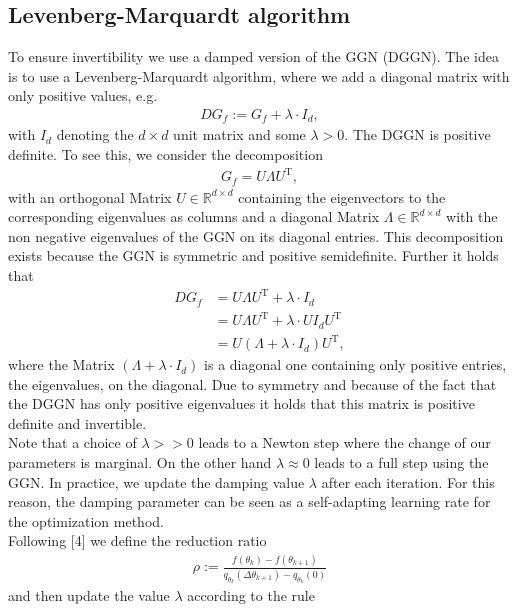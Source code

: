 \documentclass[conference]{IEEEtran}
\begin{document}
	\subsection{Levenberg-Marquardt algorithm }
	\noindent
	To ensure invertibility we use a damped version of the GGN (DGGN). The idea is to use a Levenberg-Marquardt algorithm, where we add a diagonal matrix with only positive values, e.g.
	\begin{align}
	DG_{f} := G_{f} + \lambda\cdot I_{d},
	\end{align}
	with $I_{d}$ denoting the $d\times d$ unit matrix and some $\lambda>0$.
	The DGGN is positive definite.
	To see this, we consider the decomposition
	\begin{align}
	G_{f} = U\Lambda U^{\mathrm{T}},
	\end{align}
	with an orthogonal Matrix $U\in\mathbb{R}^{d\times d}$ containing the eigenvectors to the corresponding eigenvalues as columns and a diagonal Matrix $\Lambda\in\mathbb{R}^{d\times d}$ with the non negative eigenvalues of the GGN on its diagonal entries. This decomposition exists because the GGN is symmetric and positive semidefinite. Further it holds that
	\begin{align}
	DG_{f} &= U\Lambda U^{\mathrm{T}} + \lambda\cdot I_{d}\\
	&= U\Lambda U^{\mathrm{T}} + \lambda\cdot U I_{d}U^{\mathrm{T}}\\
	&= U\left(\Lambda + \lambda\cdot I_{d}\right)U^{\mathrm{T}},
	\end{align}
	where the Matrix $\left(\Lambda + \lambda\cdot I_{d}\right)$ is a diagonal one containing only positive entries, the eigenvalues, on the diagonal. Due to symmetry and because of the fact that the DGGN has only positive eigenvalues it holds that this matrix is positive definite and invertible.\\
	Note that a choice of $\lambda>>0$ leads to a Newton step where the change of our parameters is marginal. On the other hand $\lambda\approx 0$ leads to a full step using the GGN. In practice, we update the damping value $\lambda$ after each iteration. For this reason, the damping parameter can be seen as a self-adapting learning rate for the optimization method.\\
	Following [4] we define the reduction ratio
	\begin{align}
	\rho := \frac{f(\theta_{k}) - f(\theta_{k+1})}{q_{\theta_{k}}(\Delta\theta_{k + 1}) - q_{\theta_{k}}(0)}
	\end{align}
	and then update the value $\lambda$ according to the rule
\end{document}
